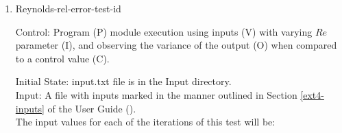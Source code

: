 \documentclass[12pt, titlepage]{article}
\newcommand{\famname}{Lattice Boltzmann Solver}
\newcounter{testcounter} %
\begin{document}
\begin{enumerate}
How test will be performed:

\begin{enumerate}
\item The Von Karman Vortex Street module shall be modified by the author to
  print the vorticity vector as output.
\item Outside of the system, the input parameter values will be written to a text file titled input.txt, as outlined in Section \ref{ext4-inputs} of the User Guide.
\item The file will be placed into the Input directory, under the home directory
  of the project.
\item {\famname} shall be run.  
\item Upon completion of the module, the output values of the vorticity vector
  will be compared to the vorticity vector values from pyLBM - comparison will
  be done per cell. Comparisons can be done manually using Excel, or through a
  script, using the equation for relative error found in Section \ref{eqerror}.
\end{enumerate}


\item{Reynolds-rel-error-test-id\thetestcounter \\}

Control: Program (P) module execution using inputs (V) with varying $Re$
parameter (I), and observing the variance of the output (O) when compared to a control value (C).  %
				
					
Initial State: input.txt file is in the Input directory.\\
					
Input: A file with inputs marked in the manner outlined in Section \ref{ext4-inputs} of the User Guide (\citet{LBM_UserGuide_PM}).\\The input values for each of the iterations of this test will be:\\


\end{enumerate}
\end{document}

